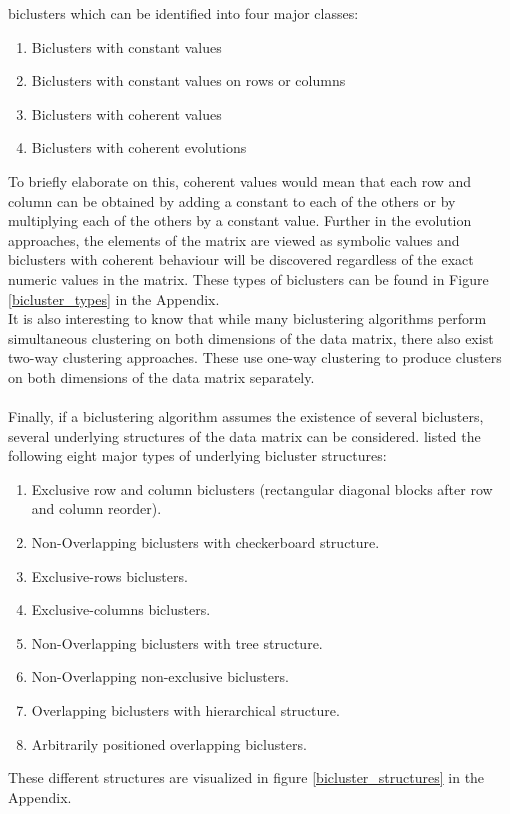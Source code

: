 \documentclass[a4paper]{article}\usepackage[]{graphicx}\usepackage[]{color}
\begin{document}
biclusters which can be identified into four major classes:
\begin{enumerate}
  \item Biclusters with constant values
  \item Biclusters with constant values on rows or columns
  \item Biclusters with coherent values
  \item Biclusters with coherent evolutions
\end{enumerate}
To briefly elaborate on this, coherent values would mean that each row and
column can be obtained by adding a constant to each of the others or by
multiplying each of the others by a constant value. Further in the evolution
approaches, the elements of the matrix are viewed as symbolic values and
biclusters with coherent behaviour will be discovered regardless of the exact
numeric values in the matrix. These types of biclusters can be found in
Figure \ref{bicluster_types} in the Appendix.\\
It is also interesting to know that while many biclustering algorithms perform
simultaneous clustering on both dimensions of the data matrix, there also exist
two-way clustering approaches. These use one-way clustering to produce clusters
on both dimensions of the data matrix separately.
\\ \\
Finally, if a biclustering algorithm assumes the existence of several
biclusters, several underlying structures of the data matrix can be considered.
\citet{Madeira2004} listed the following eight major types of underlying
bicluster structures:

\begin{enumerate}
  \item Exclusive row and column biclusters (rectangular diagonal blocks after
  row and column reorder).
  \item Non-Overlapping biclusters with checkerboard structure.
  \item Exclusive-rows biclusters.
  \item Exclusive-columns biclusters.
  \item Non-Overlapping biclusters with tree structure.
  \item Non-Overlapping non-exclusive biclusters.
  \item Overlapping biclusters with hierarchical structure.
  \item Arbitrarily positioned overlapping biclusters.
\end{enumerate}
\noindent These different structures are visualized in figure
\ref{bicluster_structures} in the Appendix.
\newpage
\end{document}
